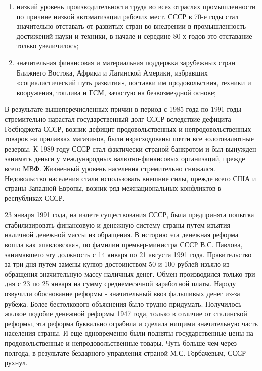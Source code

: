 \documentclass{article}
\begin{document}
\begin{enumerate}
    \item низкий уровень производительности труда во всех отраслях промышленности по причине низкой автоматизации рабочих мест. СССР в 70-е годы стал значительно отставать от развитых стран во внедрении в промышленность достижений науки и техники, в начале и середине 80-х годов это отставание только увеличилось;
    \item значительная финансовая и материальная поддержка зарубежных стран Ближнего Востока, Африки и Латинской Америки, избравших «социалистический путь развития», поставки им продовольствия, техники и вооружения, топлива и ГСМ, зачастую на безвозмездной основе;
\end{enumerate}

В результате вышеперечисленных причин в период с 1985 года по 1991 годы стремительно нарастал государственный долг СССР вследствие дефицита Госбюджета СССР, возник дефицит продовольственных и непродовольственных товаров на прилавках магазинов, были израсходованы почти все золотовалютные резервы. К 1989 году СССР стал фактически страной-банкротом и был вынужден занимать деньги у международных валютно-финансовых организаций, прежде всего МВФ. Жизненный уровень населения стремительно снижался. Недовольство населения стали использовать внешние силы, прежде всего США и страны Западной Европы, возник ряд межнациональных конфликтов в республиках СССР.

\hfill

23 января 1991 года, на излете существования СССР, была предпринята попытка стабилизировать финансовую и денежную систему страны путем изъятия наличной денежной массы из обращения. В историю эта денежная реформа вошла как «павловская», по фамилии премьер-министра СССР В.С. Павлова, занимавшего эту должность с 14 января по 21 августа 1991 года. Правительство за три дня путем замены купюр достоинством 50 и 100 рублей изъяло из обращения значительную массу наличных денег. Обмен производился только три дня с 23 по 25 января на сумму среднемесячной заработной платы. Народу озвучили обоснование реформы - значительный ввоз фальшивых денег из-за рубежа. Более бестолкового объяснения было трудно придумать. Получилось жалкое подобие денежной реформы 1947 года, только в отличие от сталинской реформы, эта реформа буквально ограбила и сделала нищими значительную часть населения страны. И еще одновременно были подняты государственные цены на продовольственные и непродовольственные товары. Чуть больше чем через полгода, в результате бездарного управления страной М.С. Горбачевым, СССР рухнул.
\end{document}
